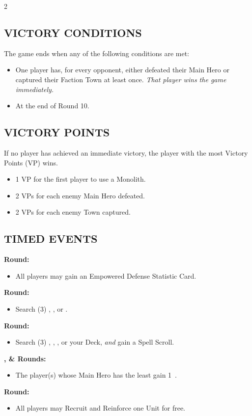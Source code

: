 \begin{multicols*}{2}
\subsection*{\MakeUppercase{Victory Conditions}}
The game ends when any of the following conditions are met:

\begin{itemize}
  \item One player has, for every opponent, either defeated their Main Hero or captured their Faction Town at least once. \textit{That player wins the game immediately.}
  \item At the end of Round 10.
\end{itemize}

\subsection*{\MakeUppercase{Victory Points}}
If no player has achieved an immediate victory, the player with the most Victory Points (VP) wins.

\begin{itemize}
  \item 1 VP for the first player to use a Monolith.
  \item 2 VPs for each enemy Main Hero defeated.
  \item 2 VPs for each enemy Town captured.
\end{itemize}

\subsection*{\MakeUppercase{Timed Events}}
\textbf{ Round:}
\begin{itemize}
  \item All players may gain an Empowered Defense Statistic Card.
\end{itemize}
\textbf{ Round:}
\begin{itemize}
  \item Search (3) , , or .
\end{itemize}
\textbf{ Round:}
\begin{itemize}
  \item Search (3) , , , or your Deck, \textit{and} gain a Spell Scroll.
\end{itemize}
\textbf{,  \&  Rounds:}
\begin{itemize}
  \item The player(s) whose Main Hero has the least  gain 1~.
\end{itemize}
\textbf{ Round:}
\begin{itemize}
  \item All players may Recruit and Reinforce one  Unit for free.
\end{itemize}


\end{multicols*}
